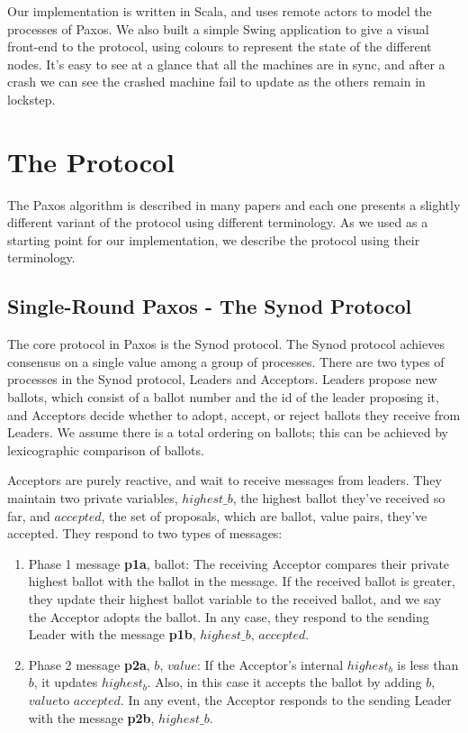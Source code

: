 \documentclass{sig-alternate}
\begin{document}
Our implementation is written in Scala, and uses remote actors to model the processes of Paxos. We also built a simple Swing application to give a visual front-end to the protocol, using colours to represent the state of the different nodes. It's easy to see at a glance that all the machines are in sync, and after a crash we can see the crashed machine fail to update as the others remain in lockstep.

\section{The Protocol}

The Paxos algorithm is described in many papers \cite{lamport_part-time_1998, lamport_paxos_2001, lampson_abcds_2001, van_renesse_paxos_2011} and each one presents a slightly different variant of the protocol using different terminology. As we used \cite{van_renesse_paxos_2011} as a starting point for our implementation, we describe the protocol using their terminology.

\subsection{Single-Round Paxos - The Synod Protocol}
The core protocol in Paxos is the Synod protocol. The Synod protocol achieves consensus on a single value among a group of processes. There are two types of processes in the Synod protocol, Leaders and Acceptors. Leaders propose new ballots, which consist of a ballot number and the id of the leader proposing it, and Acceptors decide whether to adopt, accept, or reject ballots they receive from Leaders. We assume there is a total ordering on ballots; this can be achieved by lexicographic comparison of ballots.

Acceptors are purely reactive, and wait to receive messages from leaders. They maintain two private variables, $highest\_b$, the highest ballot they've received so far, and $accepted$, the set of proposals, which are ballot, value pairs, they've accepted. They respond to two types of messages:
\begin{enumerate}
	\item Phase 1 message \textlangle \textbf{p1a}, ballot\textrangle: The receiving Acceptor compares their private highest ballot with the ballot in the message. If the received ballot is greater, they update their highest ballot variable to the received ballot, and we say the Acceptor adopts the ballot. In any case, they respond to the sending Leader with the message \textlangle \textbf{p1b}, $highest\_b$, $accepted$\textrangle.
	
	\item Phase 2 message \textlangle \textbf{p2a}, $b$, $value$\textrangle:
	If the Acceptor's internal $highest_b$ is less than $b$, it updates $highest_b$. Also, in this case it accepts the ballot by adding \textlangle$b$, $value$\textrangle  to $accepted$. In any event, the Acceptor responds to the sending Leader with the message \textlangle \textbf{p2b}, $highest\_b$\textrangle.
\end{enumerate}
\end{document}
